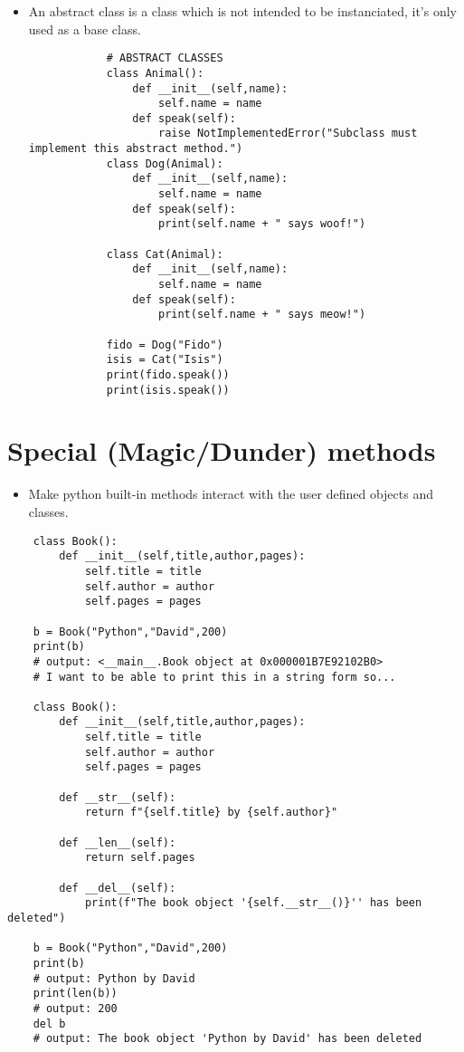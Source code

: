 \begin{itemize}
    \item An abstract class is a class which is not intended to be instanciated, it's only used as a base class. 
        \begin{verbatim}
            # ABSTRACT CLASSES
            class Animal():
                def __init__(self,name):
                    self.name = name 
                def speak(self):
                    raise NotImplementedError("Subclass must implement this abstract method.")
            class Dog(Animal):
                def __init__(self,name):
                    self.name = name 
                def speak(self):
                    print(self.name + " says woof!")

            class Cat(Animal):
                def __init__(self,name):
                    self.name = name 
                def speak(self):
                    print(self.name + " says meow!")

            fido = Dog("Fido")
            isis = Cat("Isis")
            print(fido.speak())
            print(isis.speak())
        \end{verbatim}
\end{itemize}


\section{Special (Magic/Dunder) methods}
\begin{itemize}
    \item Make python built-in methods interact with the user defined objects and classes. 
\end{itemize}
\begin{verbatim}
    class Book():
        def __init__(self,title,author,pages):
            self.title = title
            self.author = author 
            self.pages = pages 
        
    b = Book("Python","David",200)
    print(b)
    # output: <__main__.Book object at 0x000001B7E92102B0>
    # I want to be able to print this in a string form so...

    class Book():
        def __init__(self,title,author,pages):
            self.title = title
            self.author = author 
            self.pages = pages 
        
        def __str__(self):
            return f"{self.title} by {self.author}"
        
        def __len__(self):
            return self.pages

        def __del__(self):
            print(f"The book object '{self.__str__()}'' has been deleted")

    b = Book("Python","David",200)
    print(b)
    # output: Python by David
    print(len(b))
    # output: 200
    del b 
    # output: The book object 'Python by David' has been deleted
\end{verbatim}

